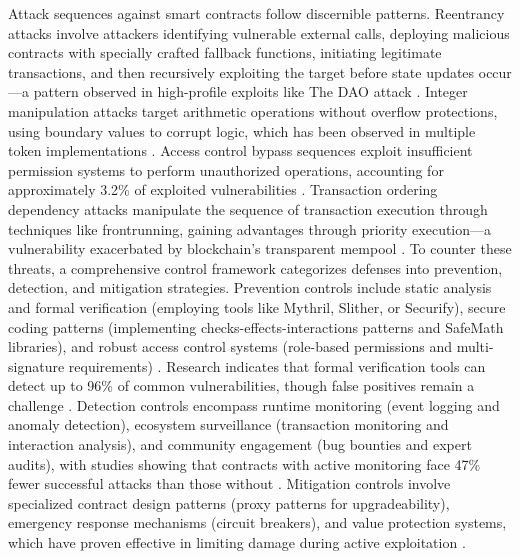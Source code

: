 Attack sequences against smart contracts follow discernible patterns. Reentrancy attacks involve attackers identifying vulnerable external calls, deploying malicious contracts with specially crafted fallback functions, initiating legitimate transactions, and then recursively exploiting the target before state updates occur—a pattern observed in high-profile exploits like The DAO attack \cite{zhou2023sok}. Integer manipulation attacks target arithmetic operations without overflow protections, using boundary values to corrupt logic, which has been observed in multiple token implementations \cite{praitheeshan2019systematic}. Access control bypass sequences exploit insufficient permission systems to perform unauthorized operations, accounting for approximately 3.2\% of exploited vulnerabilities \cite{perez2021analysis}. Transaction ordering dependency attacks manipulate the sequence of transaction execution through techniques like frontrunning, gaining advantages through priority execution—a vulnerability exacerbated by blockchain's transparent mempool \cite{praitheeshan2019systematic,zhou2023sok}. To counter these threats, a comprehensive control framework categorizes defenses into prevention, detection, and mitigation strategies. Prevention controls include static analysis and formal verification (employing tools like Mythril, Slither, or Securify), secure coding patterns (implementing checks-effects-interactions patterns and SafeMath libraries), and robust access control systems (role-based permissions and multi-signature requirements) \cite{praitheeshan2019systematic}. Research indicates that formal verification tools can detect up to 96\% of common vulnerabilities, though false positives remain a challenge \cite{praitheeshan2019systematic}. Detection controls encompass runtime monitoring (event logging and anomaly detection), ecosystem surveillance (transaction monitoring and interaction analysis), and community engagement (bug bounties and expert audits), with studies showing that contracts with active monitoring face 47\% fewer successful attacks than those without \cite{zhou2023sok}. Mitigation controls involve specialized contract design patterns (proxy patterns for upgradeability), emergency response mechanisms (circuit breakers), and value protection systems, which have proven effective in limiting damage during active exploitation \cite{Wang2019}.

